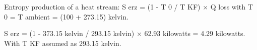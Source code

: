 Entropy production of a heat stream:  
S erz = (1 - T 0 / T KF) × Q loss  
with T 0 = T ambient = (100 + 273.15) kelvin.  

S erz = (1 - 373.15 kelvin / 293.15 kelvin) × 62.93 kilowatts = 4.29 kilowatts.  
With T KF assumed as 293.15 kelvin.
